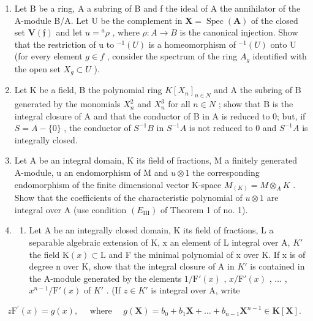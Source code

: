 \begin{enumerate}
\def\labelenumi{\arabic{enumi}.}
\setcounter{enumi}{15}
\item
  Let B be a ring, A a subring of B and f the ideal of A the annihilator of the A-module B/A. Let U be the complement in \(\mathbf{X} = \operatorname{Spec}(\mathbf{A})\) of the closed set \(\mathbf{V}(\mathfrak{f})\) and let \(u = {}^{a}\rho\) , where \(\rho: A \to B\) is the canonical injection. Show that the restriction of u to \({}^{-1}(U)\) is a homeomorphism of \({}^{-1}(U)\) onto U (for every element \(g \in f\) , consider the spectrum of the ring \(A_{g}\) identified with the open set \(X_{g} \subset U\) ).
\item
  Let K be a field, B the polynomial ring \(K[X_{n}]_{n\in N}\) and A the subring of B generated by the monomials \(X_{n}^{2}\) and \(X_{n}^{3}\) for all \(n\in N\) ; show that B is the integral closure of A and that the conductor of B in A is reduced to 0; but, if \(S=A-\{0\}\) , the conductor of \(S^{-1}B\) in \(S^{-1}A\) is not reduced to 0 and \(S^{-1}A\) is integrally closed.
\item
  Let A be an integral domain, K its field of fractions, M a finitely generated A-module, u an endomorphism of M and \(u \otimes 1\) the corresponding endomorphism of the finite dimensional vector K-space \(M_{(K)} = M \otimes_{A} K\) . Show that the coefficients of the characteristic polynomial of \(u \otimes 1\) are integral over A (use condition \((E_{\mathrm{III}})\) of Theorem 1 of no. 1).
\item
  \begin{enumerate}
  \def\labelenumii{(\alph{enumii})}
  \tightlist
  \item
    Let A be an integrally closed domain, K its field of fractions, L a separable algebraic extension of K, x an element of L integral over A, \(K'\) the field \(\mathrm{K}(x) \subset \mathrm{L}\) and F the minimal polynomial of x over K. If x is of degree n over K, show that the integral closure of A in \(K'\) is contained in the A-module generated by the elements \(1/\mathrm{F}'(x)\) , \(x/\mathrm{F}'(x)\) , \(\ldots\) , \(x^{n-1}/\mathrm{F}'(x)\) of \(K'\) . (If \(z \in K'\) is integral over A, write
  \end{enumerate}
\end{enumerate}

\[
z \mathrm{F} ^ {\prime} (x) = g (x), \quad \text { where } \quad g (\mathbf {X}) = b _ {0} + b _ {1} \mathbf {X} + \dots + b _ {n - 1} \mathbf {X} ^ {n - 1} \in \mathbf {K} [ \mathbf {X} ].
\]

